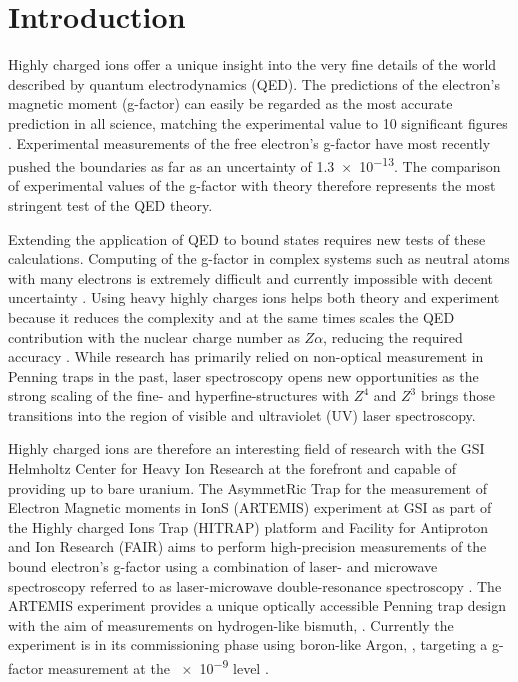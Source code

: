 \chapter{Introduction}
Highly charged ions offer a unique insight into the very fine details of the world described by quantum electrodynamics (QED). The predictions of the electron’s magnetic moment (g-factor) can easily be regarded as the most accurate prediction in all science, matching the experimental value to \num{10} significant figures \cite{gfactor_theory}. Experimental measurements of the free electron's g-factor have most recently pushed the boundaries as far as an uncertainty of \num{1.3e-13}. The comparison of experimental values of the g-factor with theory therefore represents the most stringent test of the QED theory.

Extending the application of QED to bound states requires new tests of these calculations. Computing of the g-factor in complex systems such as neutral atoms with many electrons is extremely difficult and currently impossible with decent uncertainty \cite{gfactor_theory_codegen}. Using heavy highly charges ions helps both theory and experiment because it reduces the complexity and at the same times scales the QED contribution with the nuclear charge number as $Z\alpha$, reducing the required accuracy \cite{gfactor_ions_scaling}. While research has primarily relied on non-optical measurement in Penning traps in the past, laser spectroscopy opens new opportunities \cite{penning_trap_laser_spectroscopy} as the strong scaling of the fine- and hyperfine-structures with $Z^4$ and $Z^3$ brings those transitions into the region of visible and ultraviolet (UV) laser spectroscopy.

Highly charged ions are therefore an interesting field of research with the GSI Helmholtz Center for Heavy Ion Research at the forefront and capable of providing up to bare uranium. The AsymmetRic Trap for the measurement of Electron Magnetic moments in IonS (ARTEMIS) experiment at GSI as part of the Highly charged Ions Trap (HITRAP) platform and Facility for Antiproton and Ion Research (FAIR) aims to perform high-precision measurements of the bound electron's g-factor using a combination of laser- and microwave spectroscopy referred to as laser-microwave double-resonance spectroscopy \cite{laser_microwave_double_resonance_spectroscopy}. The ARTEMIS experiment provides a unique optically accessible Penning trap design \cite{penning_trap_transparent,penning_trap_half_open} with the aim of measurements on hydrogen-like bismuth, . Currently the experiment is in its commissioning phase using boron-like Argon, , targeting a g-factor measurement at the \num{e-9} level \cite{artemis_commissioning}.

